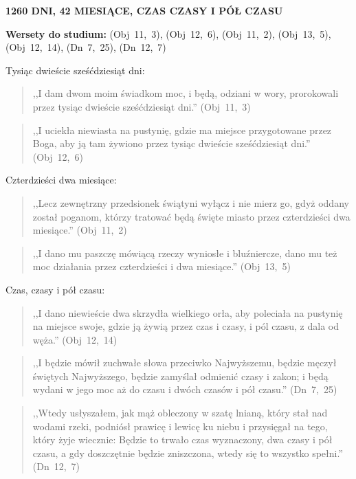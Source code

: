 \documentclass[10pt,a4paper,oneside]{article}
\begin{document}
\centerline{\textbf{\MakeUppercase{1260 dni, 42 miesiące, czas czasy i pół czasu}}}
\begin{center}
\textbf{Wersety do studium:} (Obj~11,~3), (Obj~12,~6), (Obj~11,~2), (Obj~13,~5), (Obj~12,~14), (Dn~7,~25), (Dn~12,~7)
\end{center}
Tysiąc dwieście sześćdziesiąt dni:
\begin{quote}
,,I dam dwom moim świadkom moc, i będą, odziani w wory, prorokowali przez tysiąc dwieście sześćdziesiąt dni.'' (Obj~11,~3)
\end{quote}
\begin{quote}
,,I uciekła niewiasta na pustynię, gdzie ma miejsce przygotowane przez Boga, aby ją tam żywiono przez tysiąc dwieście sześćdziesiąt dni.'' (Obj~12,~6)
\end{quote}
Czterdzieści dwa miesiące:
\begin{quote}
,,Lecz zewnętrzny przedsionek świątyni wyłącz i nie mierz go, gdyż oddany został poganom, którzy tratować będą święte miasto przez czterdzieści dwa miesiące.'' (Obj~11,~2)
\end{quote}
\begin{quote}
,,I dano mu paszczę mówiącą rzeczy wyniosłe i bluźniercze, dano mu też moc działania przez czterdzieści i dwa miesiące.'' (Obj~13,~5)
\end{quote}
Czas, czasy i pół czasu:
\begin{quote}
,,I dano niewieście dwa skrzydła wielkiego orła, aby poleciała na pustynię na miejsce swoje, gdzie ją żywią przez czas i czasy, i pól czasu, z dala od węża.'' (Obj~12,~14)
\end{quote}
\begin{quote}
,,I będzie mówił zuchwałe słowa przeciwko Najwyższemu, będzie męczył świętych Najwyższego, będzie zamyślał odmienić czasy i zakon; i będą wydani w jego moc aż do czasu i dwóch czasów i pół czasu.'' (Dn~7,~25)
\end{quote}
\begin{quote}
,,Wtedy usłyszałem, jak mąż obleczony w szatę lnianą, który stał nad wodami rzeki, podniósł prawicę i lewicę ku niebu i przysięgał na tego, który żyje wiecznie: Będzie to trwało czas wyznaczony, dwa czasy i pół czasu, a gdy doszczętnie będzie zniszczona, wtedy się to wszystko spełni.'' (Dn~12,~7)
\end{quote}
\end{document}
